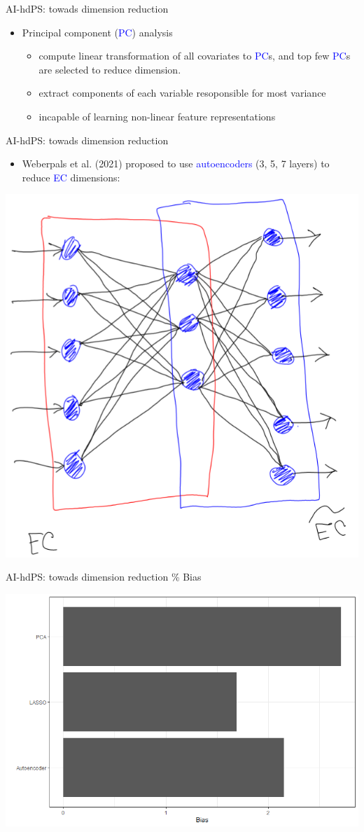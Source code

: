 \documentclass[
  ignorenonframetext,
  aspectratio=169]{beamer}
\providecommand{\tightlist}{%
  \setlength{\itemsep}{0pt}\setlength{\parskip}{0pt}}
\begin{document}
\begin{frame}{AI-hdPS: towads dimension reduction}
\protect\hypertarget{ai-hdps-towads-dimension-reduction}{}
\begin{itemize}
\tightlist
\item
  Principal component (\textcolor{blue}{PC}) analysis

  \begin{itemize}
  \tightlist
  \item
    compute linear transformation of all covariates to
    \textcolor{blue}{PC}s, and top few \textcolor{blue}{PC}s are
    selected to reduce dimension.
  \item
    extract components of each variable resoponsible for most variance
  \item
    incapable of learning non-linear feature representations
  \end{itemize}
\end{itemize}
\end{frame}

\begin{frame}{AI-hdPS: towads dimension reduction}
\protect\hypertarget{ai-hdps-towads-dimension-reduction-1}{}
\begin{itemize}
\tightlist
\item
  Weberpals et al. (2021) proposed to use \textcolor{blue}{autoencoders}
  (3, 5, 7 layers) to reduce \textcolor{blue}{EC} dimensions:
\end{itemize}

\begin{center}
\includegraphics[width=0.3\linewidth]{ae.png}
\end{center}
\end{frame}

\begin{frame}{AI-hdPS: towads dimension reduction}
\protect\hypertarget{ai-hdps-towads-dimension-reduction-2}{}
\% Bias

\begin{center}
\includegraphics[width=0.5\linewidth]{Bias.png}
\end{center}
\end{frame}
\end{document}
